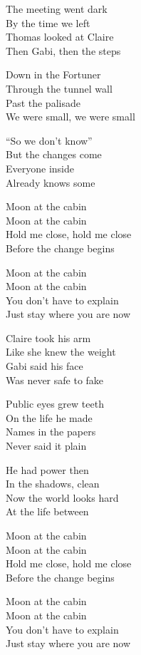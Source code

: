\begin{lyrics}
The meeting went dark\\
By the time we left\\
Thomas looked at Claire\\
Then Gabi, then the steps

Down in the Fortuner\\
Through the tunnel wall\\
Past the palisade\\
We were small, we were small

“So we don’t know”\\
But the changes come\\
Everyone inside\\
Already knows some

Moon at the cabin\\
Moon at the cabin\\
Hold me close, hold me close\\
Before the change begins

Moon at the cabin\\
Moon at the cabin\\
You don’t have to explain\\
Just stay where you are now

Claire took his arm\\
Like she knew the weight\\
Gabi said his face\\
Was never safe to fake

Public eyes grew teeth\\
On the life he made\\
Names in the papers\\
Never said it plain

He had power then\\
In the shadows, clean\\
Now the world looks hard\\
At the life between

Moon at the cabin\\
Moon at the cabin\\
Hold me close, hold me close\\
Before the change begins

Moon at the cabin\\
Moon at the cabin\\
You don’t have to explain\\
Just stay where you are now


\end{lyrics}
